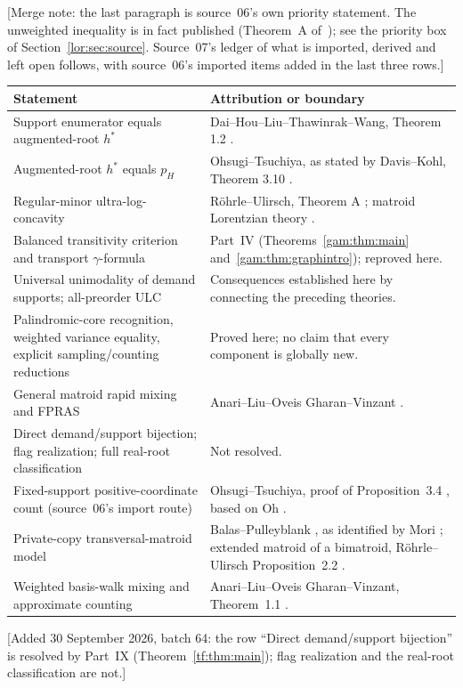\documentclass[11pt]{article}
\numberwithin{equation}{section}
\theoremstyle{definition}
\begin{document}
[Merge note: the last paragraph is source~06's own priority statement. The
unweighted inequality is in fact published (Theorem~A of~\cite{RU}); see the
priority box of Section~\ref{lor:sec:source}. Source~07's ledger of what is
imported, derived and left open follows, with source~06's imported items
added in the last three rows.]
\begin{center}\small
\begin{tabularx}{\textwidth}{@{}>{\raggedright\arraybackslash}p{}Y@{}}
\toprule
Statement & Attribution or boundary\\\midrule
Support enumerator equals augmented-root $h^*$ & Dai--Hou--Liu--Thawinrak--Wang, Theorem 1.2 \cite{DHLTW}.\\
Augmented-root $h^*$ equals $p_H$ & Ohsugi--Tsuchiya, as stated by Davis--Kohl, Theorem 3.10 \cite{DK}.\\
Regular-minor ultra-log-concavity & R\"ohrle--Ulirsch, Theorem A \cite{RU}; matroid Lorentzian theory \cite{BH}.\\
Balanced transitivity criterion and transport $\gamma$-formula & Part~IV (Theorems~\ref{gam:thm:main} and~\ref{gam:thm:graphintro}); reproved here.\\
Universal unimodality of demand supports; all-preorder ULC & Consequences established here by connecting the preceding theories.\\
Palindromic-core recognition, weighted variance equality, explicit sampling/counting reductions & Proved here; no claim that every component is globally new.\\
General matroid rapid mixing and FPRAS & Anari--Liu--Oveis Gharan--Vinzant \cite{ALOV}.\\
Direct demand/support bijection; flag realization; full real-root classification & Not resolved.\\
\midrule
Fixed-support positive-coordinate count (source~06's import route) & Ohsugi--Tsuchiya, proof of Proposition~3.4 \cite{OT20}, based on Oh \cite{Oh}.\\
Private-copy transversal-matroid model & Balas--Pulleyblank \cite{BP}, as identified by Mori \cite{Mori}; extended matroid of a bimatroid, R\"ohrle--Ulirsch Proposition~2.2 \cite{RU}.\\
Weighted basis-walk mixing and approximate counting & Anari--Liu--Oveis Gharan--Vinzant, Theorem~1.1 \cite{ALOV}.\\
\bottomrule
\end{tabularx}
\end{center}
[Added 30 September 2026, batch 64: the row ``Direct demand/support
bijection'' is resolved by Part~IX (Theorem~\ref{tf:thm:main}); flag
realization and the real-root classification are not.]
\end{document}
